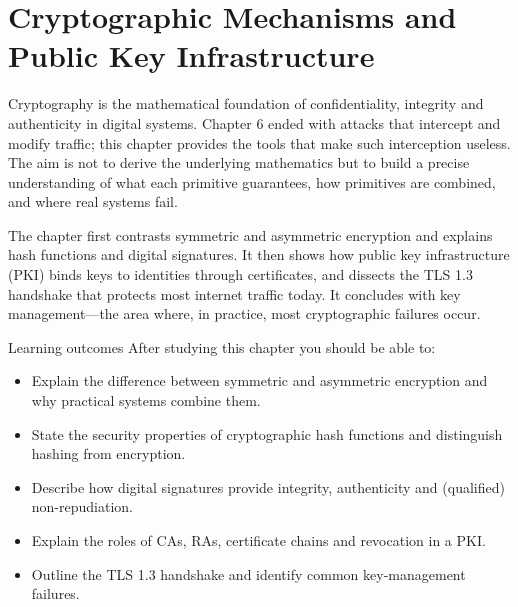 \chapter{Cryptographic Mechanisms and Public Key Infrastructure}\label{ch:7}

Cryptography is the mathematical foundation of confidentiality, integrity and authenticity in digital systems. Chapter 6 ended with attacks that intercept and modify traffic; this chapter provides the tools that make such interception useless. The aim is not to derive the underlying mathematics but to build a precise understanding of what each primitive guarantees, how primitives are combined, and where real systems fail.

The chapter first contrasts symmetric and asymmetric encryption and explains hash functions and digital signatures. It then shows how public key infrastructure (PKI) binds keys to identities through certificates, and dissects the TLS 1.3 handshake that protects most internet traffic today. It concludes with key management—the area where, in practice, most cryptographic failures occur.

\begin{outcomesbox}{Learning outcomes}
After studying this chapter you should be able to:
\begin{itemize}
  \item Explain the difference between symmetric and asymmetric encryption and why practical systems combine them.
  \item State the security properties of cryptographic hash functions and distinguish hashing from encryption.
  \item Describe how digital signatures provide integrity, authenticity and (qualified) non-repudiation.
  \item Explain the roles of CAs, RAs, certificate chains and revocation in a PKI.
  \item Outline the TLS 1.3 handshake and identify common key-management failures.
\end{itemize}
\end{outcomesbox}

